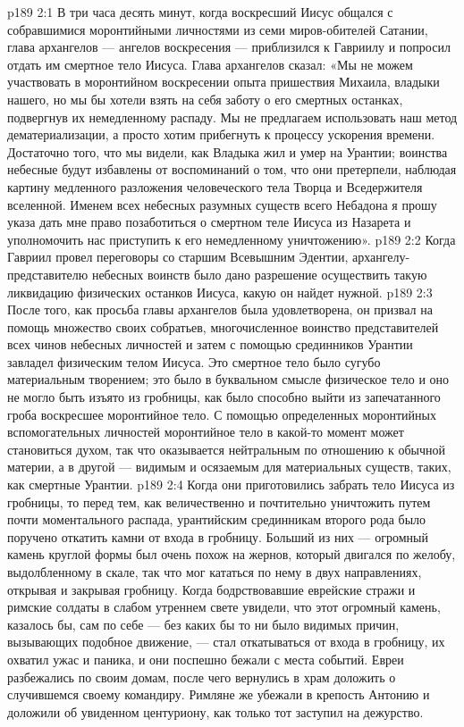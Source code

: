 \vs p189 2:1 В три часа десять минут, когда воскресший Иисус общался с собравшимися моронтийными личностями из семи миров\hyp{}обителей Сатании, глава архангелов --- ангелов воскресения --- приблизился к Гавриилу и попросил отдать им смертное тело Иисуса. Глава архангелов сказал: «Мы не можем участвовать в моронтийном воскресении опыта пришествия Михаила, владыки нашего, но мы бы хотели взять на себя заботу о его смертных останках, подвергнув их немедленному распаду. Мы не предлагаем использовать наш метод дематериализации, а просто хотим прибегнуть к процессу ускорения времени. Достаточно того, что мы видели, как Владыка жил и умер на Урантии; воинства небесные будут избавлены от воспоминаний о том, что они претерпели, наблюдая картину медленного разложения человеческого тела Творца и Вседержителя вселенной. Именем всех небесных разумных существ всего Небадона я прошу указа дать мне право позаботиться о смертном теле Иисуса из Назарета и уполномочить нас приступить к его немедленному уничтожению».
\vs p189 2:2 Когда Гавриил провел переговоры со старшим Всевышним Эдентии, архангелу\hyp{}представителю небесных воинств было дано разрешение осуществить такую ликвидацию физических останков Иисуса, какую он найдет нужной.
\vs p189 2:3 После того, как просьба главы архангелов была удовлетворена, он призвал на помощь множество своих собратьев, многочисленное воинство представителей всех чинов небесных личностей и затем с помощью срединников Урантии завладел физическим телом Иисуса. Это смертное тело было сугубо материальным творением; это было в буквальном смысле физическое тело и оно не могло быть изъято из гробницы, как было способно выйти из запечатанного гроба воскресшее моронтийное тело. С помощью определенных моронтийных вспомогательных личностей моронтийное тело в какой\hyp{}то момент может становиться духом, так что оказывается нейтральным по отношению к обычной материи, а в другой --- видимым и осязаемым для материальных существ, таких, как смертные Урантии.
\vs p189 2:4 Когда они приготовились забрать тело Иисуса из гробницы, то перед тем, как величественно и почтительно уничтожить путем почти моментального распада, урантийским срединникам второго рода было поручено откатить камни от входа в гробницу. Больший из них --- огромный камень круглой формы был очень похож на жернов, который двигался по желобу, выдолбленному в скале, так что мог кататься по нему в двух направлениях, открывая и закрывая гробницу. Когда бодрствовавшие еврейские стражи и римские солдаты в слабом утреннем свете увидели, что этот огромный камень, казалось бы, сам по себе --- без каких бы то ни было видимых причин, вызывающих подобное движение, --- стал откатываться от входа в гробницу, их охватил ужас и паника, и они поспешно бежали с места событий. Евреи разбежались по своим домам, после чего вернулись в храм доложить о случившемся своему командиру. Римляне же убежали в крепость Антонию и доложили об увиденном центуриону, как только тот заступил на дежурство.
